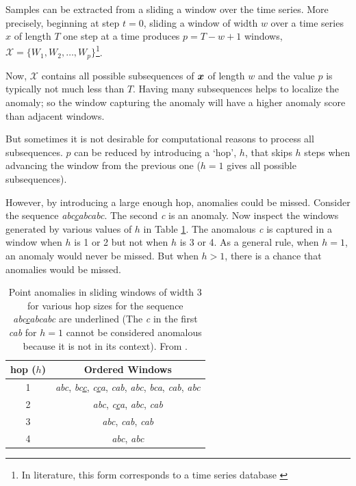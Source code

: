 Samples can be extracted from a sliding a window over the time series. More precisely, beginning at step $t=0$, sliding a window of width $w$ over a time series $x$ of length $T$ one step at a time produces $p=T-w+1$ windows, $\mathcal{X}=\{W_1,W_2,\ldots,W_p\}$\footnote{In literature, this form corresponds to a time series database \cite{Gupta2013}}.

Now, $\mathcal{X}$ contains all possible subsequences of $\boldsymbol{x}$ of length $w$ and the value $p$ is typically not much less than $T$. Having many subsequences helps to localize the anomaly; so the window capturing the anomaly will have a higher anomaly score than adjacent windows.

But sometimes it is not desirable for computational reasons to process all subsequences. $p$ can be reduced by introducing a `hop', $h$, that skips $h$ steps when advancing the window from the previous one ($h=1$ gives all possible subsequences).

However, by introducing a large enough hop, anomalies could be missed. Consider the sequence \emph{abc\underline{c}abcabc}. The second \emph{c} is an anomaly. Now inspect the windows generated by various values of $h$ in Table \ref{tbl:hop}. The anomalous \emph{c} is captured in a window when $h$ is 1 or 2 but not when $h$ is 3 or 4. As a general rule, when $h=1$, an anomaly would never be missed. But when $h>1$, there is a chance that anomalies would be missed.

\begin{table}[h]
  \centering
  \caption[Point anomalies in sliding windows of various hop sizes]{Point anomalies in sliding windows of width 3 for various hop sizes for the sequence \emph{abc\underline{c}abcabc} are underlined (The \emph{c} in the first \emph{cab} for $h=1$ cannot be considered anomalous because it is not in its context). From \cite{Cheboli2010}.}
  \begin{tabular}{|c|c|}
    \hline
    hop ($h$) & Ordered Windows \\
    \hline
    \hline
    1 & \emph{abc},
        \emph{bc\underline{c}}, 
        \emph{c\underline{c}a}, 
        \emph{cab},
        \emph{abc}, 
        \emph{bca},
        \emph{cab},
        \emph{abc} \\
    \hline
    2 & \emph{abc},
        \emph{c\underline{c}a},
        \emph{abc},
        \emph{cab} \\
    \hline
    3 & \emph{abc}, 
        \emph{cab},
        \emph{cab} \\
    \hline
    4 & \emph{abc}, 
        \emph{abc} \\
    \hline
  \end{tabular}
  \label{tbl:hop}
\end{table}

